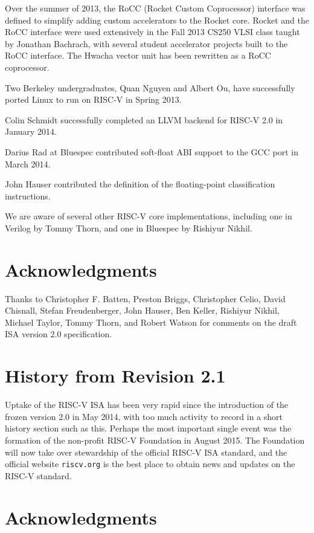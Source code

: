 Over the summer of 2013, the RoCC (Rocket Custom Coprocessor)
interface was defined to simplify adding custom accelerators to the
Rocket core.  Rocket and the RoCC interface were used extensively in
the Fall 2013 CS250 VLSI class taught by Jonathan Bachrach, with
several student accelerator projects built to the RoCC interface.  The
Hwacha vector unit has been rewritten as a RoCC coprocessor.

Two Berkeley undergraduates, Quan Nguyen and Albert Ou, have
successfully ported Linux to run on RISC-V in Spring 2013.

Colin Schmidt successfully completed an LLVM backend for RISC-V 2.0 in
January 2014.

Darius Rad at Bluespec contributed soft-float ABI support to the GCC port in
March 2014.

John Hauser contributed the definition of the floating-point classification
instructions.

We are aware of several other RISC-V core implementations, including
one in Verilog by Tommy Thorn, and one in Bluespec by Rishiyur Nikhil.

\section*{Acknowledgments}

Thanks to Christopher F. Batten, Preston Briggs, Christopher Celio, David
Chisnall, Stefan Freudenberger, John Hauser, Ben Keller, Rishiyur
Nikhil, Michael Taylor, Tommy Thorn, and Robert Watson for comments on
the draft ISA version 2.0 specification.

\section{History from Revision 2.1}

Uptake of the RISC-V ISA has been very rapid since the introduction of
the frozen version 2.0 in May 2014, with too much activity to record
in a short history section such as this.  Perhaps the most important
single event was the formation of the non-profit RISC-V Foundation in
August 2015. The Foundation will now take over stewardship of the
official RISC-V ISA standard, and the official website {\tt riscv.org}
is the best place to obtain news and updates on the RISC-V standard.

\section*{Acknowledgments}

